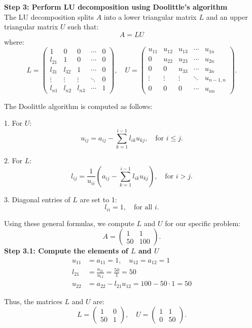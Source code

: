 \documentclass[journal]{IEEEtran}
\begin{document}
	\textbf{Step 3: Perform LU decomposition using Doolittle's algorithm}\\
	The LU decomposition splits \(A\) into a lower triangular matrix \(L\) and an upper triangular matrix \(U\) such that:
	\[
	A = LU
	\]
	where:
	\[
	L = \begin{pmatrix} 1 & 0 & 0 & \cdots & 0 \\ l_{21} & 1 & 0 & \cdots & 0 \\ l_{31} & l_{32} & 1 & \cdots & 0 \\ \vdots & \vdots & \vdots & \ddots & 0 \\ l_{n1} & l_{n2} & l_{n3} & \cdots & 1 \end{pmatrix}, \quad
	U = \begin{pmatrix} u_{11} & u_{12} & u_{13} & \cdots & u_{1n} \\ 0 & u_{22} & u_{23} & \cdots & u_{2n} \\ 0 & 0 & u_{33} & \cdots & u_{3n} \\ \vdots & \vdots & \vdots & \ddots & u_{n-1,n} \\ 0 & 0 & 0 & \cdots & u_{nn} \end{pmatrix}.
	\]
	
	The Doolittle algorithm is computed as follows:
	
	1. For \(U\):
	\[
	u_{ij} = a_{ij} - \sum_{k=1}^{i-1} l_{ik} u_{kj}, \quad \text{for } i \leq j.
	\]
	
	2. For \(L\):
	\[
	l_{ij} = \frac{1}{u_{ii}} \left(a_{ij} - \sum_{k=1}^{i-1} l_{ik} u_{kj} \right), \quad \text{for } i > j.
	\]
	
	3. Diagonal entries of \(L\) are set to 1:
	\[
	l_{ii} = 1, \quad \text{for all } i.
	\]
	
	Using these general formulas, we compute \(L\) and \(U\) for our specific problem:
	\[
	A = \begin{pmatrix} 1 & 1 \\ 50 & 100 \end{pmatrix}.
	\]
	\textbf{Step 3.1: Compute the elements of \(L\) and \(U\)}\\
	\begin{align}
		u_{11} &= a_{11} = 1, \quad u_{12} = a_{12} = 1 \\
		l_{21} &= \frac{a_{21}}{u_{11}} = \frac{50}{1} = 50 \\
		u_{22} &= a_{22} - l_{21}u_{12} = 100 - 50 \cdot 1 = 50
	\end{align}
	
	Thus, the matrices \(L\) and \(U\) are:
	\[
	L = \begin{pmatrix} 1 & 0 \\ 50 & 1 \end{pmatrix}, \quad U = \begin{pmatrix} 1 & 1 \\ 0 & 50 \end{pmatrix}.
	\]
	
\end{document}
